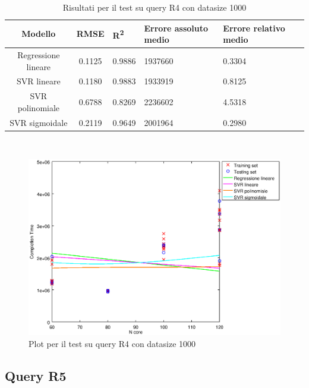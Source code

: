 \documentclass[a4paper,11pt]{article}
\begin{document}
\begin{table}[bhpt]
	\centering
	\begin{adjustbox}{center}
		\begin{tabular}{c | c M{1.2cm} M{2.5cm} M{2.5cm} M{1.8cm}}
			Modello & RMSE & R\textsuperscript{2} & Errore assoluto medio & Errore relativo medio \tabularnewline
			\hline
			Regressione lineare & 0.1125 & 0.9886 & 1937660 & 0.3304 \\
			SVR lineare & 0.1180 & 0.9883 & 1933919 & 0.8125 \\
			SVR polinomiale & 0.6788 & 0.8269 & 2236602 & 4.5318 \\
			SVR sigmoidale & 0.2119 & 0.9649 & 2001964 & 0.2980 \\
		\end{tabular}
	\end{adjustbox}
	\\
	\caption{Risultati per il test su query R4 con datasize 1000}
	\label{table_R4_1000}
\end{table}

\begin {figure}[hbtp]
\centering
\includegraphics[width=\textwidth]{output/R4_1000/plot_R4_1000.eps}
\caption {Plot per il test su query R4 con datasize 1000}
\end {figure}

\newpage
\subsection{Query R5}
\end{document}

